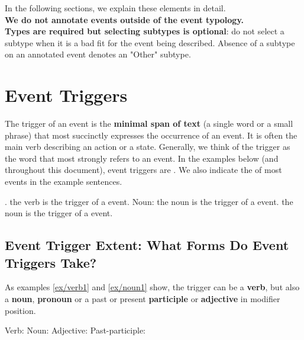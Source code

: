 In the following sections, we explain these elements in detail.\\

\noindent
\textbf{We do not annotate events outside of the event typology.}\\
\noindent
\textbf{Types are required but selecting subtypes is optional}: do not select a subtype when it is a bad fit for the event being described. Absence of a subtype on an annotated event denotes an "Other" subtype.

\section{Event Triggers}

The trigger of an event is the \textbf{minimal span of text} (a single word or a small phrase) that most succinctly expresses the occurrence of an event.
It is often the main verb describing an action or a state.
Generally, we think of the trigger as the word that most strongly refers to an event.
In the examples below (and throughout this document), event triggers are .
We also indicate the  of most events in the example sentences.

\begin{exe}
    \ex\label{ex/verb1} .
        \expl the verb  is the trigger of a  event.
    \ex\label{ex/noun1} Noun: 
        \expl the noun  is the trigger of a  event.
    \ex\label{ex/noun2} 
        \expl the noun  is the trigger of a  event.
\end{exe}

\subsection{Event Trigger Extent: What Forms Do Event Triggers Take?}
As examples \ref{ex/verb1} and \ref{ex/noun1} show, the trigger can be a \textbf{verb}, but also a \textbf{noun}, \textbf{pronoun} or a past or present \textbf{participle} or \textbf{adjective} in modifier position.

\begin{exe}
    \ex\label{ex/verb2} Verb: 
    \ex\label{ex/noun3} Noun: 
    \ex\label{ex/adjective} Adjective: 
    \ex\label{ex/pastparticiple} Past-participle: 
\end{exe}

